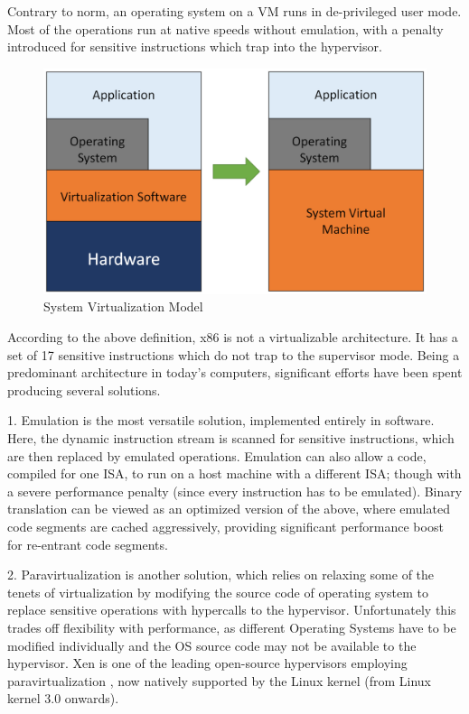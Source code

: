 Contrary to norm, an operating system on a VM runs in de-privileged user mode. Most of the operations run at native speeds without emulation, with a penalty introduced for sensitive instructions which trap into the hypervisor.

\setlength{\belowcaptionskip}{-10pt}

\begin{figure}[H]
  \centering
  \includegraphics[scale=0.6]{figures/sys_virt.png}
  \caption{System Virtualization Model}
  \label{fig:sys_virt}
\end{figure}

According to the above definition, x86 is not a virtualizable architecture. It has a set of 17 sensitive instructions which do not trap to the supervisor mode. Being a predominant architecture in today’s computers, significant efforts have been spent producing several solutions.

1. Emulation is the most versatile solution, implemented entirely in software. Here, the dynamic instruction stream is scanned for sensitive instructions, which are then replaced by emulated operations. Emulation can also allow a code, compiled for one ISA, to run on a host machine with a different ISA; though with a severe performance penalty (since every instruction has to be emulated). Binary translation can be viewed as an optimized version of the above, where emulated code segments are cached aggressively, providing significant performance boost for re-entrant code segments.

2. Paravirtualization is another solution, which relies on relaxing some of the tenets of virtualization by modifying the source code of operating system to replace sensitive operations with hypercalls to the hypervisor. Unfortunately this trades off flexibility with performance, as different Operating Systems have to be modified individually and the OS source code may not be available to the hypervisor. Xen is one of the leading open-source hypervisors employing paravirtualization \cite{xen_virt}, now natively supported by the Linux kernel (from Linux kernel 3.0 onwards).

